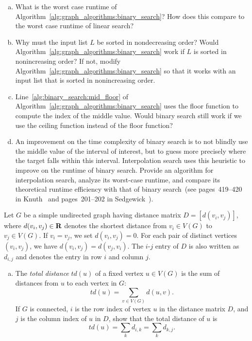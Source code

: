 \begin{problem}
\begin{enumerate}[(a)]
  \item What is the worst case runtime of
    Algorithm~\ref{alg:graph_algorithms:binary_search}? How does this
    compare to the worst case runtime of linear search?

  \item Why must the input list $L$ be sorted in nondecreasing order?
    Would Algorithm~\ref{alg:graph_algorithms:binary_search} work if
    $L$ is sorted in nonincreasing order? If not, modify
    Algorithm~\ref{alg:graph_algorithms:binary_search} so that it
    works with an input list that is sorted in nonincreasing order.

  \item Line~\ref{alg:binary_search:mid_floor} of
    Algorithm~\ref{alg:graph_algorithms:binary_search} uses the floor
    function to compute the index of the middle value. Would binary
    search still work if we use the ceiling function instead of the
    floor function?

  \item An improvement on the time complexity of binary search is to
    not blindly use the middle value of the interval of interest, but
    to guess more precisely where the target falls within this
    interval. Interpolation search uses this heuristic to improve on
    the runtime of binary search. Provide an algorithm for
    interpolation search, analyze its worst-case runtime, and compare
    its theoretical runtime efficiency with that of binary search~(see
    pages~419--420 in Knuth~\cite{Knuth1998c} and pages~201--202 in
    Sedgewick~\cite{Sedgewick1990}).
  \end{enumerate}

\item Let $G$ be a simple undirected graph having distance matrix
  $D = [d(v_i, v_j)]$, where $d(v_i, v_j) \in \mathbf{R}$ denotes the shortest
  distance from $v_i \in V(G)$ to $v_j \in V(G)$. If $v_i = v_j$, we
  set $d(v_i, v_j) = 0$. For each pair of distinct vertices
  $(v_i, v_j)$, we have $d(v_i, v_j) = d(v_j, v_i)$. The $i$-$j$ entry
  of $D$ is also written as $d_{i,j}$ and denotes the entry in row $i$
  and column $j$.
  \begin{enumerate}[(a)]
  \item The \emph{total distance} $td(u)$ of a fixed vertex
    $u \in V(G)$ is the sum of distances from $u$ to each vertex in $G$:
    \[
    td(u)
    =
    \sum_{v \in V(G)} d(u,v).
    \]
    If $G$ is connected, $i$ is the row index of vertex $u$ in the
    distance matrix $D$, and $j$ is the column index of $u$ in $D$,
    show that the total distance of $u$ is
    \begin{equation}
    \label{eqn:graph_algorithms:total_distance_vertex}
    td(u)
    =
    \sum_k d_{i,k}
    =
    \sum_k d_{k,j}.
    \end{equation}


\end{enumerate}
\end{problem}
